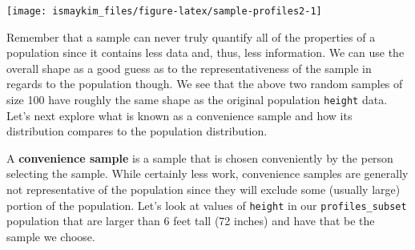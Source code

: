 \documentclass[]{tufte-book}
\newenvironment{Shaded}{\begin{snugshade}}{\end{snugshade}}
\newcommand{\KeywordTok}[1]{\textcolor[rgb]{0.13,0.29,0.53}{\textbf{{#1}}}}
\newcommand{\DataTypeTok}[1]{\textcolor[rgb]{0.13,0.29,0.53}{{#1}}}
\newcommand{\DecValTok}[1]{\textcolor[rgb]{0.00,0.00,0.81}{{#1}}}
\newcommand{\StringTok}[1]{\textcolor[rgb]{0.31,0.60,0.02}{{#1}}}
\newcommand{\OtherTok}[1]{\textcolor[rgb]{0.56,0.35,0.01}{{#1}}}
\newcommand{\NormalTok}[1]{{#1}}
\begin{document}
\begin{Shaded}
\end{Shaded}

\begin{center}\texttt{[image: ismaykim\_files/figure-latex/sample-profiles2-1]} \end{center}

Remember that a sample can never truly quantify all of the properties of
a population since it contains less data and, thus, less information. We
can use the overall shape as a good guess as to the representativeness
of the sample in regards to the population though. We see that the above
two random samples of size 100 have roughly the same shape as the
original population \texttt{height} data. Let's next explore what is
known as a convenience sample and how its distribution compares to the
population distribution.

A \textbf{convenience sample} is a sample that is chosen conveniently by
the person selecting the sample. While certainly less work, convenience
samples are generally not representative of the population since they
will exclude some (usually large) portion of the population. Let's look
at values of \texttt{height} in our \texttt{profiles\_subset} population
that are larger than 6 feet tall (72 inches) and have that be the sample
we choose.

\begin{Shaded}
\end{Shaded}
\end{document}
